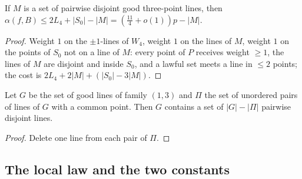 \begin{lemma}\label{lem:cert}
If $M$ is a set of pairwise disjoint good three-point lines, then $\alpha(f,B)\le2L_4+|S_0|-|M|=(\tfrac{11}4+o(1))p-|M|$.
\end{lemma}
\begin{proof}
Weight $1$ on the $\pm1$-lines of $W_4$, weight $1$ on the lines of $M$, weight $1$ on the points of $S_0$ not on a line of $M$: every point of $P$
receives weight $\ge1$, the lines of $M$ are disjoint and inside $S_0$, and a lawful set meets a line in $\le2$ points; the cost is
$2L_4+2|M|+(|S_0|-3|M|)$.
\end{proof}

\begin{lemma}[matching]\label{lem:match}
Let $G$ be the set of good lines of family $(1,3)$ and $\Pi$ the set of unordered pairs of lines of $G$ with a common point.  Then $G$ contains a set of
$|G|-|\Pi|$ pairwise disjoint lines.
\end{lemma}
\begin{proof}
Delete one line from each pair of $\Pi$.
\end{proof}

\subsection*{The local law and the two constants}


